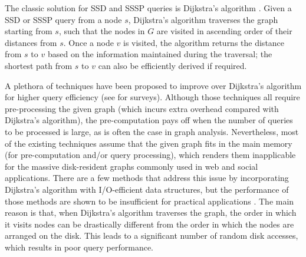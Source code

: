 \documentclass{sig-alternate}
\def\vgap{\vspace{0mm}}
\begin{document}
\begin{sloppy}

\vgap


The classic solution for SSD and SSSP queries is Dijkstra's algorithm \cite{d59}. Given a SSD or SSSP query from a node $s$, Dijkstra's algorithm traverses the graph starting from $s$, such that the nodes in $G$ are visited in ascending order of their distances from $s$. Once a node $v$ is visited, the algorithm returns the distance from $s$ to $v$ based on the information maintained during the traversal; the shortest path from $s$ to $v$ can also be efficiently derived if required.

\vgap

A plethora of techniques have been proposed to improve over Dijkstra's algorithm for higher query efficiency (see \cite{dss09,s12} for surveys). Although those techniques all require pre-processing the given graph (which incurs extra overhead compared with Dijkstra's algorithm), the pre-computation pays off when the number of queries to be processed is large, as is often the case in graph analysis. Nevertheless, most of the existing techniques assume that the given graph fits in the main memory (for pre-computation and/or query processing), which renders them inapplicable for the massive disk-resident graphs commonly used in web and social applications. There are a few methods \cite{mo09,mz03,mz12,m09,ks96} that address this issue by incorporating Dijkstra's algorithm with I/O-efficient data structures, but the performance of those methods are shown to be insufficient for practical applications \cite{ckcc12}. The main reason is that, when Dijkstra's algorithm traverses the graph, the order in which it visits nodes can be drastically different from the order in which the nodes are arranged on the disk. This leads to a significant number of random disk accesses, which results in poor query performance.


\end{sloppy}
\end{document}
